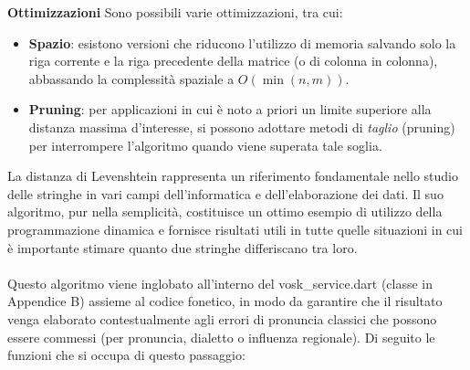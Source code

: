 \documentclass[14pt]{extbook}
\begin{document}
\textbf{Ottimizzazioni}
Sono possibili varie ottimizzazioni, tra cui:
\begin{itemize}
  \item \textbf{Spazio}: esistono versioni che riducono l’utilizzo di memoria 
        salvando solo la riga corrente e la riga precedente della matrice 
        (o di colonna in colonna), abbassando la complessità spaziale a $O(\min(n,m))$.
  \item \textbf{Pruning}: per applicazioni in cui è noto a priori un limite 
        superiore alla distanza massima d’interesse, si possono adottare 
        metodi di \emph{taglio} (pruning) per interrompere l’algoritmo quando 
        viene superata tale soglia.
\end{itemize}

La distanza di Levenshtein rappresenta un riferimento fondamentale nello studio  delle stringhe in vari campi dell’informatica e dell’elaborazione dei dati. Il  suo algoritmo, pur nella semplicità, costituisce un ottimo esempio di utilizzo della programmazione dinamica e fornisce risultati utili in tutte quelle situazioni in cui è importante stimare quanto due stringhe differiscano tra loro.\cite{wikipedia:levenshtein} \\\\

Questo algoritmo viene inglobato all'interno del vosk\_service.dart (classe in Appendice B) assieme al codice fonetico, in modo da garantire che il risultato venga elaborato contestualmente agli errori di pronuncia classici che possono essere commessi (per pronuncia, dialetto o influenza regionale). Di seguito le funzioni che si occupa di questo passaggio:\\\\
\end{document}
